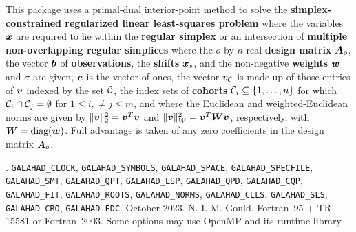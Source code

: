 \documentclass{galahad}
\newcommand{\packagename}{SLLSB}
\newcommand{\fullpackagename}{\libraryname\_\packagename}
\begin{document}
\galheader


\galsummary
This package uses a primal-dual interior-point method to solve the
{\bf simplex-constrained regularized linear least-squares problem}
where the variables ${\bm{x}}$ are required to lie within the
{\bf regular simplex}
or an intersection of {\bf multiple non-overlapping regular simplices}
where the $o$ by $n$ real {\bf design matrix} ${\bm{A}}_o$, the vector ${\bm{b}}$
of {\bf observations}, the {\bf shifts} ${\bm{x}}_s$,
and the non-negative {\bf weights} ${\bm{w}}$ and $\sigma$ are given, 
${\bm{e}}$ is the vector of ones, 
the vector $\bmv_{\calC}$ is made up of those entries of ${\bm{v}}$ indexed by
the set $\calC$, 
the index sets of {\bf cohorts} $\calC_i \subseteq \{1,\ldots,n\}$
for which $\calC_i \cap \calC_j = \emptyset$ for $1 \leq i, \neq j \leq m$,
and where the Euclidean and weighted-Euclidean norms
are given by $\|{\bm{v}}\|_2^2 = {\bm{v}}^T {\bm{v}}$ and $\|{\bm{v}}\|_W^2 = {\bm{v}}^T {\bm{W}} {\bm{v}}$,
respectively, with ${\bm{W}} = \mbox{diag}({\bm{w}})$.
Full advantage is taken of any zero coefficients in the design matrix ${\bm{A}}_o$.


\galattributes
\galversions{\tt  \fullpackagename\_single, \fullpackagename\_double}.
\galuses
{\tt GALAHAD\_CLOCK},
{\tt GALAHAD\_SY\-M\-BOLS},
{\tt GALAHAD\-\_SPACE},
{\tt GALAHAD\_SPECFILE},
{\tt GALAHAD\_SMT},
{\tt GALAHAD\_QPT},
{\tt GALAHAD\_LSP},
{\tt GALAHAD\_\-QPD},
{\tt GALAHAD\_\-CQP},
{\tt GALAHAD\_\-FIT},
{\tt GALAHAD\_\-ROOTS},
{\tt GALAHAD\_\-NORMS},
{\tt GALAHAD\_\-CLLS},
{\tt GALAHAD\_\-SLS},
{\tt GALAHAD\_\-CRO},
{\tt GALAHAD\_FDC}.
\galdate October 2023.
\galorigin N. I. M. Gould.
\gallanguage Fortran~95 + TR 15581 or Fortran~2003.
\galparallelism Some options may use OpenMP and its runtime library.


\galhowto

\end{document}
